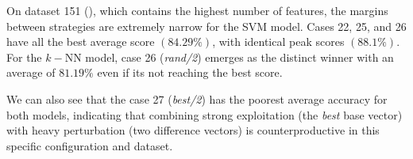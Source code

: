 \documentclass[12pt, openany]{article}
\begin{document}
On dataset 151 (), which contains the highest number of features, the margins between strategies are extremely narrow for the SVM model. Cases 22, 25, and 26 have all the best average score $(84.29\%)$, with identical peak scores $(88.1\%)$. For the $k-$NN model, case 26 (\textit{rand/2}) emerges as the distinct winner with an average of $81.19\%$ even if its not reaching the best score.

We can also see that the case 27 (\textit{best/2}) has the poorest average accuracy for both models, indicating that combining strong exploitation (the \textit{best} base vector) with heavy perturbation (two difference vectors) is counterproductive in this specific configuration and dataset.

\begin{table}[H]
    \centering
    \renewcommand{\arraystretch}{1.2}
\end{table}
\end{document}
